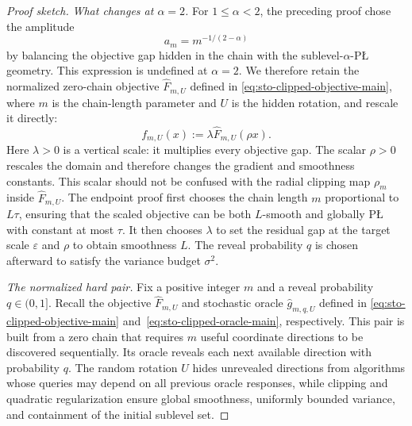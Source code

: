 \documentclass[11pt]{article}
\begin{document}
\begin{proof}[Proof sketch]
\emph{What changes at \(\alpha=2\).}
For \(1\le\alpha<2\), the preceding proof chose the amplitude
\[
a_m=m^{-1/(2-\alpha)}
\]
by balancing the objective gap hidden in the chain with the sublevel-\(\alpha\)-P\L{} geometry. This expression is
undefined at \(\alpha=2\). We therefore retain the normalized zero-chain objective \(\widehat F_{m,U}\) defined in \eqref{eq:sto-clipped-objective-main}, where \(m\)
is the chain-length parameter and \(U\) is the hidden rotation, and rescale it directly:
\begin{equation}
\label{eq:endpoint-scaled-objective-main}
f_{m,U}(x):=\lambda\widehat F_{m,U}(\rho x).
\end{equation}
Here \(\lambda>0\) is a vertical scale: it multiplies every objective gap. The scalar \(\rho>0\) rescales the domain
and therefore changes the gradient and smoothness constants. This scalar should not be confused with the radial
clipping map \(\rho_m\) inside \(\widehat F_{m,U}\). The endpoint proof first chooses the chain length \(m\)
proportional to \(L\tau\), ensuring that the scaled objective can be both \(L\)-smooth and globally P\L{} with
constant at most \(\tau\). It then chooses \(\lambda\) to set the residual gap at the target scale \(\varepsilon\) and
\(\rho\) to obtain smoothness \(L\). The reveal probability \(q\) is chosen afterward to satisfy the variance budget
\(\sigma^2\).

\emph{The normalized hard pair.}
Fix a positive integer \(m\) and a reveal probability \(q\in(0,1]\). Recall the objective
\(\widehat F_{m,U}\) and stochastic oracle \(\widehat g_{m,q,U}\) defined in
\eqref{eq:sto-clipped-objective-main} and~\eqref{eq:sto-clipped-oracle-main}, respectively. This pair is built from a
zero chain that requires \(m\) useful coordinate directions to be discovered sequentially. Its oracle reveals each
next available direction with probability \(q\). The random rotation \(U\) hides unrevealed directions from algorithms
whose queries may depend on all previous oracle responses, while clipping and quadratic regularization ensure global
smoothness, uniformly bounded variance, and containment of the initial sublevel set.


\end{proof}
\end{document}
